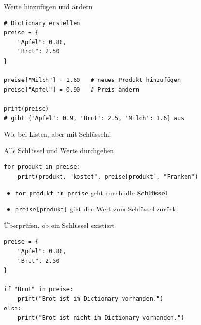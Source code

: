 \begin{frame}[fragile]{Werte hinzufügen und ändern}
	\begin{lstlisting}
# Dictionary erstellen
preise = {
    "Apfel": 0.80,
    "Brot": 2.50
}

preise["Milch"] = 1.60   # neues Produkt hinzufügen
preise["Apfel"] = 0.90   # Preis ändern

print(preise)
# gibt {'Apfel': 0.9, 'Brot': 2.5, 'Milch': 1.6} aus
	\end{lstlisting}
	\begin{center}
		Wie bei Listen, aber mit Schlüsseln!
	\end{center}
\end{frame}

\begin{frame}[fragile]{Alle Schlüssel und Werte durchgehen}
	\begin{lstlisting}[basicstyle=\ttfamily\footnotesize]
for produkt in preise:
    print(produkt, "kostet", preise[produkt], "Franken")
	\end{lstlisting}
	\begin{itemize}[<+->]
		\item \lstinline|for produkt in preise| geht durch alle \textbf{Schlüssel} 
		\item \lstinline|preise[produkt]| gibt den Wert zum Schlüssel zurück
	\end{itemize}
\end{frame}

\begin{frame}[fragile]{Überprüfen, ob ein Schlüssel existiert}
	\begin{lstlisting}
preise = {
	"Apfel": 0.80,
	"Brot": 2.50
}

if "Brot" in preise:
	print("Brot ist im Dictionary vorhanden.")
else:
	print("Brot ist nicht im Dictionary vorhanden.")
	\end{lstlisting}
\end{frame}


